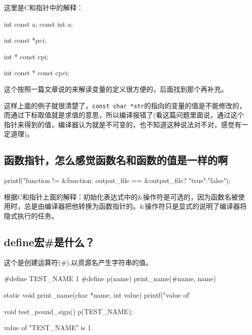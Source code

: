 这里是C和指针中的解释：

\begin{C}
int const a;
const int a;
\end{C}


\begin{C}
int const *pci;
\end{C}

\begin{C}
int * const cpi;
\end{C}

\begin{C}[这个指针和值都不能修改]
int const * const cpci;
\end{C}

这个按照一篇文章说的来解读变量的定义很方便的，后面找到那个再补充。


这样上面的例子就很清楚了，\lstinline$const char *str$的指向的变量的值是不能修改的，而通过下标取值就是求值的意思，所以编译报错了(看这篇问题里面说，通过这个指针来得到的值，编译器认为就是不可变的，也不知道这种说法对不对，感觉有一定道理)。

\subsection{函数指针，怎么感觉函数名和函数的值是一样的啊}

\begin{C}[这是我不能理解的]
printf("function != &function:%
	output_file == &output_file? "true":"false");
\end{C}

根据C和指针上面的解释：初始化表达式中的\&操作符是可选的，因为函数名被使用时，总是由编译器把他转换为函数指针的。\&操作符只是显式的说明了编译器将隐式执行的任务。

\subsection{define宏\#是什么？}

这个是创建运算符(\#),以资源名产生字符串的值。

\begin{C}
#define TEST_NAME 1
#define p(name) print_name(#name, name)

static void print_name(char *name, int value)
{
	printf("value of \"%
}

void test_pound_sign()
{
	p(TEST_NAME);
}
\end{C}

\begin{Command-Line}[运行结果]
value of "TEST_NAME" is 1.
\end{Command-Line}